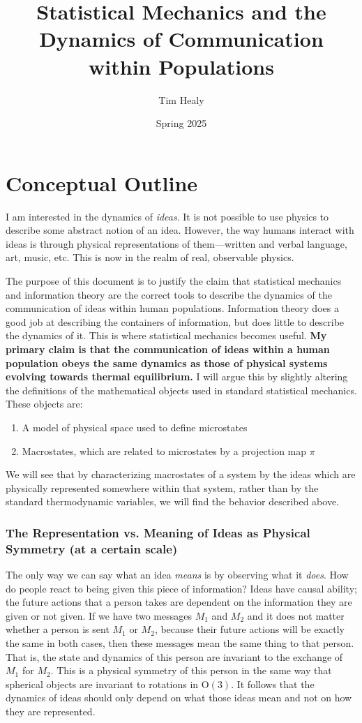 \documentclass{article}
\title{Statistical Mechanics and the Dynamics of Communication within Populations}
\author{Tim Healy}
\date{Spring 2025}
\begin{document}
\maketitle


\section{Conceptual Outline}

I am interested in the dynamics of \emph{ideas}. It is not possible to use physics to describe some abstract notion of an idea. However, the way humans interact with ideas is through physical representations of them––written and verbal language, art, music, etc. This is now in the realm of real, observable physics.

The purpose of this document is to justify the claim that statistical mechanics and information theory are the correct tools to describe the dynamics of the communication of ideas within human populations. Information theory does a good job at describing the containers of information, but does little to describe the dynamics of it. This is where statistical mechanics becomes useful. \textbf{My primary claim is that the communication of ideas within a human population obeys the same dynamics as those of physical systems evolving towards thermal equilibrium.} I will argue this by slightly altering the definitions of the mathematical objects used in standard statistical mechanics. These objects are:

\begin{enumerate}
    \item A model of physical space used to define microstates
    \item Macrostates, which are related to microstates by a projection map $\pi$
\end{enumerate} 

We will see that by characterizing macrostates of a system by the ideas which are physically represented somewhere within that system, rather than by the standard thermodynamic variables, we will find the behavior described above.

\subsubsection{The Representation vs. Meaning of Ideas as Physical Symmetry (at a certain scale)}

The only way we can say what an idea \emph{means} is by observing what it \emph{does}. How do people react to being given this piece of information? Ideas have causal ability; the future actions that a person takes are dependent on the information they are given or not given. If we have two messages $M_1$ and $M_2$ and it does not matter whether a person is sent $M_1$ or $M_2$, because their future actions will be exactly the same in both cases, then these messages mean the same thing to that person. That is, the state and dynamics of this person are invariant to the exchange of $M_1$ for $M_2$. This is a physical symmetry of this person in the same way that spherical objects are invariant to rotations in O$(3)$. It follows that the dynamics of ideas should only depend on what those ideas mean and not on how they are represented.
\end{document}
